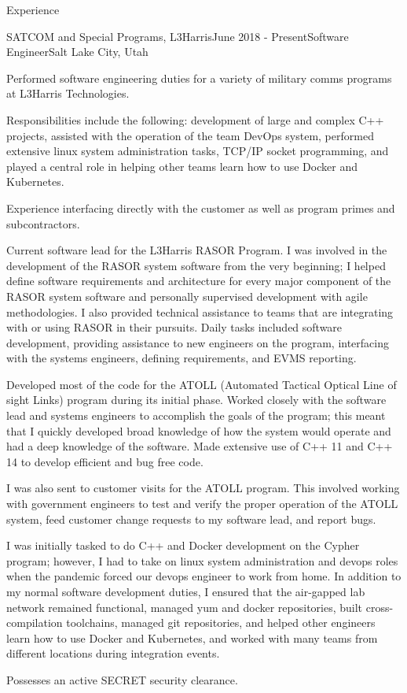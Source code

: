 \documentclass{resume} %
\begin{document}
\begin{rSection}{Experience}

  \begin{rSubsection}{SATCOM and Special Programs, L3Harris}{June 2018 - Present}{Software Engineer}{Salt Lake City, Utah}
  \item Performed software engineering duties for a variety of military comms programs at L3Harris Technologies. 
  \item Responsibilities include the following: development of large and complex C++ projects, assisted with the operation of the team DevOps system, performed extensive linux system administration tasks, TCP/IP socket programming, and played a central role in helping other teams learn how to use Docker and Kubernetes. 
  \item Experience interfacing directly with the customer as well as program primes and subcontractors. 
  \item Current software lead for the L3Harris RASOR Program. I was involved in the development of the RASOR system software from the very beginning; I helped define software requirements and architecture for every major component of the RASOR system software and personally supervised development with agile methodologies. I also provided technical assistance to teams that are integrating with or using RASOR in their pursuits. Daily tasks included software development, providing assistance to new engineers on the program, interfacing with the systems engineers, defining requirements, and EVMS reporting.
  \item Developed most of the code for the ATOLL (Automated Tactical Optical Line of sight Links) program during its initial phase. Worked closely with the software lead and systems engineers to accomplish the goals of the program; this meant that I quickly developed broad knowledge of how the system would operate and had a deep knowledge of the software. Made extensive use of C++ 11 and C++ 14 to develop efficient and bug free code. 
  \item I was also sent to customer visits for the ATOLL program. This involved working with government engineers to test and verify the proper operation of the ATOLL system, feed customer change requests to my software lead, and report bugs. 
  \item I was initially tasked to do C++ and Docker development on the Cypher program; however, I had to take on linux system administration and devops roles when the pandemic forced our devops engineer to work from home. In addition to my normal software development duties, I ensured that the air-gapped lab network remained functional, managed yum and docker repositories, built cross-compilation toolchains, managed git repositories, and helped other engineers learn how to use Docker and Kubernetes, and worked with many teams from different locations during integration events. 
  \item Possesses an active SECRET security clearance.
  \end{rSubsection}
  

\end{rSection}
\end{document}
